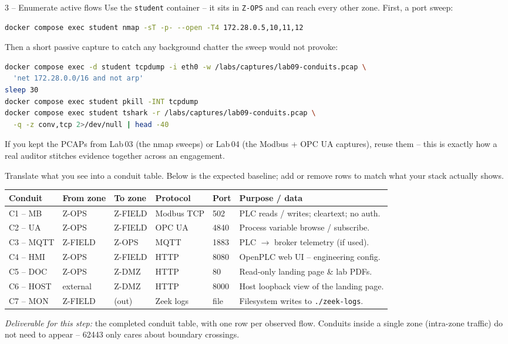 \documentclass[11pt,a4paper]{article}
\begin{document}
\begin{stepbox}{3 -- Enumerate active flows}
Use the \texttt{student} container -- it sits in \texttt{Z-OPS} and can reach every other zone. First, a port sweep:
\begin{lstlisting}[language=bash]
docker compose exec student nmap -sT -p- --open -T4 172.28.0.5,10,11,12
\end{lstlisting}
Then a short passive capture to catch any background chatter the sweep would not provoke:
\begin{lstlisting}[language=bash]
docker compose exec -d student tcpdump -i eth0 -w /labs/captures/lab09-conduits.pcap \
  'net 172.28.0.0/16 and not arp'
sleep 30
docker compose exec student pkill -INT tcpdump
docker compose exec student tshark -r /labs/captures/lab09-conduits.pcap \
  -q -z conv,tcp 2>/dev/null | head -40
\end{lstlisting}
If you kept the PCAPs from Lab\,03 (the nmap sweeps) or Lab\,04 (the Modbus + OPC UA captures), reuse them -- this is exactly how a real auditor stitches evidence together across an engagement.
\medskip

Translate what you see into a conduit table. Below is the expected baseline; add or remove rows to match what your stack actually shows.
\medskip

\noindent\small
\begin{tabular}{@{}p{} p{} p{} p{} p{} p{}@{}}
\toprule
\textbf{Conduit} & \textbf{From zone} & \textbf{To zone} & \textbf{Protocol} & \textbf{Port} & \textbf{Purpose / data} \\
\midrule
C1 -- MB    & Z-OPS   & Z-FIELD & Modbus TCP & 502  & PLC reads / writes; cleartext; no auth. \\
C2 -- UA    & Z-OPS   & Z-FIELD & OPC UA     & 4840 & Process variable browse / subscribe. \\
C3 -- MQTT  & Z-FIELD & Z-OPS   & MQTT       & 1883 & PLC $\to$ broker telemetry (if used). \\
C4 -- HMI   & Z-OPS   & Z-FIELD & HTTP       & 8080 & OpenPLC web UI -- engineering config. \\
C5 -- DOC   & Z-OPS   & Z-DMZ   & HTTP       & 80   & Read-only landing page \& lab PDFs. \\
C6 -- HOST  & external & Z-DMZ  & HTTP       & 8000 & Host loopback view of the landing page. \\
C7 -- MON   & Z-FIELD & (out)   & Zeek logs  & file & Filesystem writes to \texttt{./zeek-logs}. \\
\bottomrule
\end{tabular}
\medskip

\emph{Deliverable for this step:} the completed conduit table, with one row per observed flow. Conduits inside a single zone (intra-zone traffic) do not need to appear -- 62443 only cares about boundary crossings.
\end{stepbox}
\end{document}
